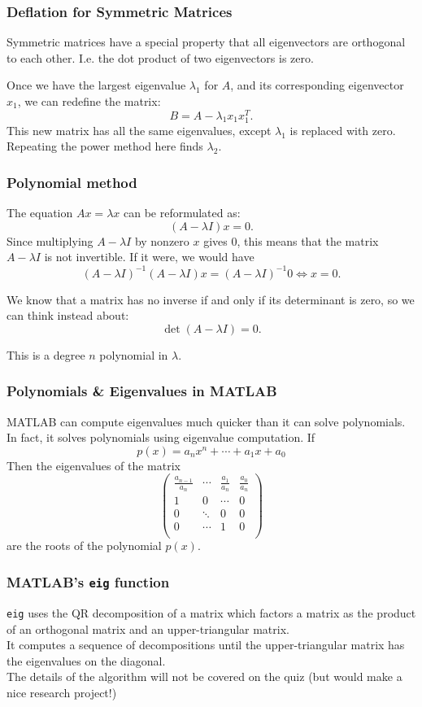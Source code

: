 \documentclass[12pt]{beamer}
\theoremstyle{definition}
\begin{document}
\begin{frame}
\frametitle{Deflation for Symmetric Matrices}

Symmetric matrices have a special property that 
all eigenvectors are orthogonal to each other. I.e. the dot
product of two eigenvectors is zero.

Once we have the largest eigenvalue $\lambda_1$ for $A$, and its
corresponding eigenvector $x_1$, we can
redefine the matrix:
\[ B = A - \lambda_1 x_1 x_1^T.\]
This new matrix has all the same eigenvalues, except $\lambda_1$ is 
replaced with zero. Repeating the power method here finds $\lambda_2$.
\end{frame}

\begin{frame}
\frametitle{Polynomial method}

The equation $Ax = \lambda x $ can be reformulated as:
\[( A - \lambda I) x = 0.\]
Since multiplying $A - \lambda I$ by nonzero $x$ gives $0$, this means that
the matrix $A - \lambda I$ is not invertible. If it were, we would have
\[( A - \lambda I)^{-1}( A - \lambda I) x = ( A - \lambda I)^{-1}0 \iff x = 0.\]

We know that a matrix has no inverse if and only if
its determinant is zero, so we can think instead about:
\[ \det(A - \lambda I) = 0.\]

This is a degree $n$ polynomial in $\lambda$.
\end{frame}

\begin{frame}
\frametitle{Polynomials \& Eigenvalues in MATLAB}

MATLAB can compute eigenvalues much quicker than it can 
solve polynomials. In fact, it solves polynomials using 
eigenvalue computation. If
\[ p(x) = a_n x^n + \cdots + a_1 x + a_0\]
Then the eigenvalues of the matrix
\[ \left(\begin{array}{cccc}
\frac{a_{n-1}}{a_n} & \cdots & \frac{a_{1}}{a_n} & \frac{a_{0}}{a_n} \\
1 & 0 & \cdots & 0  \\
0 & \ddots & 0 & 0 \\
0 & \cdots & 1 & 0 \\
\end{array} \right)
\]
are the roots of the polynomial $p(x)$.
\end{frame}

\begin{frame}
\frametitle{MATLAB's {\tt eig} function}

{\tt eig} uses the QR decomposition of a matrix which
factors a matrix as the product of an orthogonal matrix
and an upper-triangular matrix.\\

It computes a sequence of decompositions until the
upper-triangular matrix has the eigenvalues on the diagonal.\\

The details of the algorithm will not be covered on the quiz
(but would make a nice research project!)

\end{frame}
\end{document}
